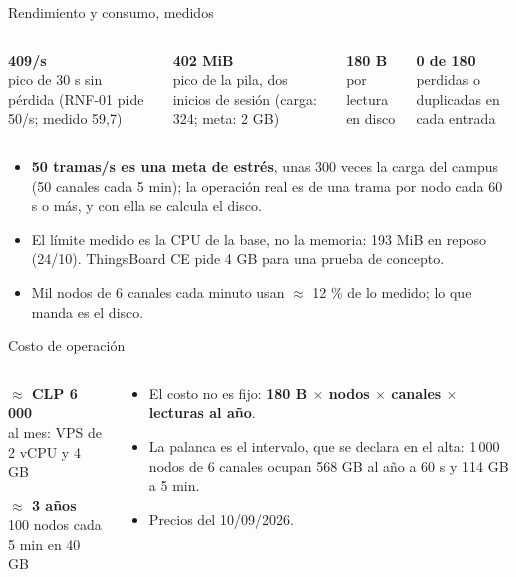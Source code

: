 \documentclass[aspectratio=169,11pt]{beamer}
\gdef\lafuente{}
\newcommand{\fuente}[1]{\gdef\lafuente{#1}}
\newcommand{\cifra}[2]{\begin{tarjeta}{\large\bfseries\color{marino}#1}\\[1pt]{\scriptsize\color{gris}#2}\end{tarjeta}}
\begin{document}
\begin{frame}{Rendimiento y consumo, medidos}
  \begin{columns}[T,onlytextwidth]
    \begin{column}{0.24\textwidth}\cifra{409/s}{pico de 30 s sin pérdida (RNF-01 pide 50/s; medido 59,7)}\end{column}
    \begin{column}{0.24\textwidth}\cifra{402 MiB}{pico de la pila, dos inicios de sesión (carga: 324; meta: 2 GB)}\end{column}
    \begin{column}{0.24\textwidth}\cifra{180 B}{por lectura en disco}\end{column}
    \begin{column}{0.24\textwidth}\cifra{0 de 180}{perdidas o duplicadas en cada entrada}\end{column}
  \end{columns}
  \footnotesize
  \begin{itemize}
    \item \textbf{50 tramas/s es una meta de estrés}, unas 300 veces la carga del campus (50 canales cada 5 min); la operación
      real es de una trama por nodo cada 60 s o más, y con ella se calcula el disco.
    \item El límite medido es la CPU de la base, no la memoria: 193 MiB en reposo (24/10). ThingsBoard CE pide 4 GB para una prueba
      de concepto.
    \item Mil nodos de 6 canales cada minuto usan $\approx$ 12 \% de lo medido; lo que manda es el disco.
  \end{itemize}
  \fuente{docs/02 (fundamento de RNF-01); docs/16 §10 y §49; docs/14 §2.1; docs/01 (referentes)}
\end{frame}

\begin{frame}{Costo de operación}
  \begin{columns}[T,onlytextwidth]
    \begin{column}{0.32\textwidth}
      \cifra{$\approx$ CLP 6\,000}{al mes: VPS de 2 vCPU y 4 GB}
      \cifra{$\approx$ 3 años}{100 nodos cada 5 min en 40 GB}
    \end{column}
    \begin{column}{0.64\textwidth}
      \begin{itemize}
        \item El costo no es fijo: \textbf{180 B $\times$ nodos $\times$ canales $\times$ lecturas al año}.
        \item La palanca es el intervalo, que se declara en el alta: 1\,000 nodos de 6 canales ocupan 568 GB al año a 60 s
          y 114 GB a 5 min.
        \item Precios del 10/09/2026.
      \end{itemize}
    \end{column}
  \end{columns}
  \fuente{docs/14 §2.1, §3 y §5}
\end{frame}
\end{document}
